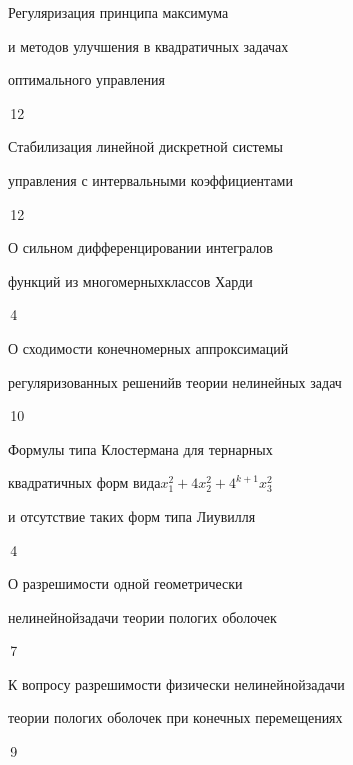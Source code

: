 



{Регуляризация принципа максимума\newline


и методов улучшения в квадратичных задачах


оптимального управления}{\No\,12}




{Стабилизация линейной дискретной системы\newline


управления с интервальными коэффициентами}{\No\,12}




{О сильном дифференцировании интегралов 


функций из многомерных\newline классов Харди}{\No\,4}






{О сходимости конечномерных аппроксимаций 


регуляризованных решений\newline в теории нелинейных задач}{\No\,10}




{Формулы типа Клостермана для тернарных 


квадратичных форм вида\newline $x^2_1+4x^2_2+4^{k+1}x^2_3$ 


и отсутствие таких форм типа Лиувилля}{\No\,4}




{О разрешимости одной геометрически


нелинейной\newline задачи теории пологих оболочек}{\No\,7}




{К вопросу разрешимости физически нелинейной\newline задачи 


теории пологих оболочек при конечных перемещениях}{\No\,9}


